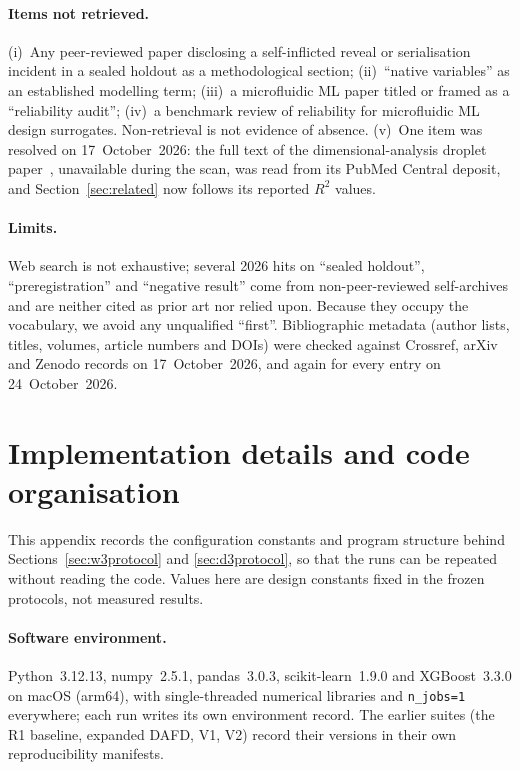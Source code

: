 \documentclass[11pt,a4paper]{article}
\begin{document}
\paragraph{Items not retrieved.} (i)~Any peer-reviewed paper disclosing a
self-inflicted reveal or serialisation incident in a sealed holdout as a
methodological section; (ii)~``native variables'' as an established modelling
term; (iii)~a microfluidic ML paper titled or framed as a ``reliability audit'';
(iv)~a benchmark review of reliability for microfluidic ML design surrogates.
Non-retrieval is not evidence of absence. (v)~One item was resolved on
17~October~2026: the full text of the dimensional-analysis droplet
paper~\cite{labchip2025dimless}, unavailable during the scan, was read from
its PubMed Central deposit, and Section~\ref{sec:related} now follows its
reported $R^2$ values.

\paragraph{Limits.} Web search is not exhaustive; several 2026 hits on
``sealed holdout'', ``preregistration'' and ``negative result'' come from
non-peer-reviewed self-archives and are neither cited as prior art nor relied
upon. Because they occupy the vocabulary, we avoid any unqualified ``first''.
Bibliographic metadata (author lists, titles, volumes, article numbers and
DOIs) were checked against Crossref, arXiv and Zenodo records on
17~October~2026, and again for every entry on 24~October~2026.

\section{Implementation details and code organisation}
\label{app:impl}
This appendix records the configuration constants and program structure
behind Sections~\ref{sec:w3protocol} and \ref{sec:d3protocol}, so that the
runs can be repeated without reading the code. Values here are design
constants fixed in the frozen protocols, not measured results.

\paragraph{Software environment.} Python~3.12.13, numpy~2.5.1,
pandas~3.0.3, scikit-learn~1.9.0 and XGBoost~3.3.0 on macOS (arm64), with
single-threaded numerical libraries and \texttt{n\_jobs=1} everywhere; each
run writes its own environment record. The earlier suites (the R1 baseline, expanded
DAFD, V1, V2) record their versions in their own reproducibility manifests.
\end{document}
